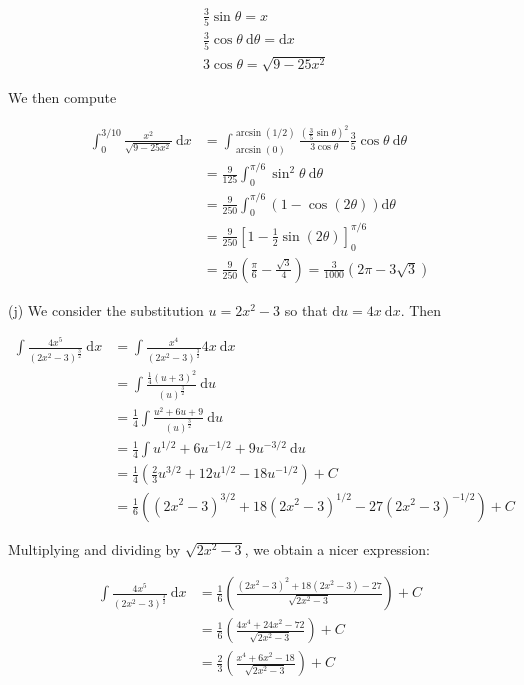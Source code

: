 \documentclass[10pt]{article}
\begin{document}
$$
\begin{aligned}
& \frac{3}{5} \sin \theta=x \\
& \frac{3}{5} \cos \theta \mathrm{~d} \theta=\mathrm{d} x \\
& 3 \cos \theta=\sqrt{9-25 x^{2}}
\end{aligned}
$$

We then compute

$$
\begin{aligned}
\int_{0}^{3 / 10} \frac{x^{2}}{\sqrt{9-25 x^{2}}} \mathrm{~d} x & =\int_{\arcsin (0)}^{\arcsin (1 / 2)} \frac{\left(\frac{3}{5} \sin \theta\right)^{2}}{3 \cos \theta} \frac{3}{5} \cos \theta \mathrm{~d} \theta \\
& =\frac{9}{125} \int_{0}^{\pi / 6} \sin ^{2} \theta \mathrm{~d} \theta \\
& =\frac{9}{250} \int_{0}^{\pi / 6}(1-\cos (2 \theta)) \mathrm{d} \theta \\
& =\frac{9}{250}\left[1-\frac{1}{2} \sin (2 \theta)\right]_{0}^{\pi / 6} \\
& =\frac{9}{250}\left(\frac{\pi}{6}-\frac{\sqrt{3}}{4}\right)=\frac{3}{1000}(2 \pi-3 \sqrt{3})
\end{aligned}
$$

(j) We consider the substitution $u=2 x^{2}-3$ so that $\mathrm{d} u=4 x \mathrm{~d} x$. Then

$$
\begin{aligned}
\int \frac{4 x^{5}}{\left(2 x^{2}-3\right)^{\frac{3}{2}}} \mathrm{~d} x & =\int \frac{x^{4}}{\left(2 x^{2}-3\right)^{\frac{3}{2}}} 4 x \mathrm{~d} x \\
& =\int \frac{\frac{1}{4}(u+3)^{2}}{(u)^{\frac{3}{2}}} \mathrm{~d} u \\
& =\frac{1}{4} \int \frac{u^{2}+6 u+9}{(u)^{\frac{3}{2}}} \mathrm{~d} u \\
& =\frac{1}{4} \int u^{1 / 2}+6 u^{-1 / 2}+9 u^{-3 / 2} \mathrm{~d} u \\
& =\frac{1}{4}\left(\frac{2}{3} u^{3 / 2}+12 u^{1 / 2}-18 u^{-1 / 2}\right)+C \\
& =\frac{1}{6}\left(\left(2 x^{2}-3\right)^{3 / 2}+18\left(2 x^{2}-3\right)^{1 / 2}-27\left(2 x^{2}-3\right)^{-1 / 2}\right)+C
\end{aligned}
$$

Multiplying and dividing by $\sqrt{2 x^{2}-3}$, we obtain a nicer expression:

$$
\begin{aligned}
\int \frac{4 x^{5}}{\left(2 x^{2}-3\right)^{\frac{3}{2}}} \mathrm{~d} x & =\frac{1}{6}\left(\frac{\left(2 x^{2}-3\right)^{2}+18\left(2 x^{2}-3\right)-27}{\sqrt{2 x^{2}-3}}\right)+C \\
& =\frac{1}{6}\left(\frac{4 x^{4}+24 x^{2}-72}{\sqrt{2 x^{2}-3}}\right)+C \\
& =\frac{2}{3}\left(\frac{x^{4}+6 x^{2}-18}{\sqrt{2 x^{2}-3}}\right)+C
\end{aligned}
$$
\end{document}
